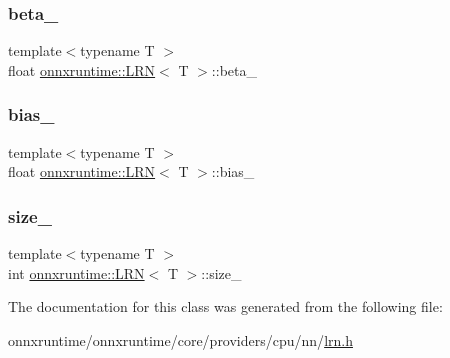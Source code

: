 \mbox{\label{classonnxruntime_1_1LRN_a690f2ff9893fad8423d0534af3e04869}} 
\subsubsection{\texorpdfstring{beta\+\_\+}{beta\_}}
{\footnotesize\ttfamily template$<$typename T $>$ \\
float \mbox{\hyperlink{classonnxruntime_1_1LRN}{onnxruntime\+::\+L\+RN}}$<$ T $>$\+::beta\+\_\+\hspace{0.3cm}{\ttfamily [protected]}}

\mbox{\label{classonnxruntime_1_1LRN_a94db5cd6e1d3ffebdee9413a08af9d90}} 
\subsubsection{\texorpdfstring{bias\+\_\+}{bias\_}}
{\footnotesize\ttfamily template$<$typename T $>$ \\
float \mbox{\hyperlink{classonnxruntime_1_1LRN}{onnxruntime\+::\+L\+RN}}$<$ T $>$\+::bias\+\_\+\hspace{0.3cm}{\ttfamily [protected]}}

\mbox{\label{classonnxruntime_1_1LRN_a4b87739b763f4acccd164dfd4c3397cb}} 
\subsubsection{\texorpdfstring{size\+\_\+}{size\_}}
{\footnotesize\ttfamily template$<$typename T $>$ \\
int \mbox{\hyperlink{classonnxruntime_1_1LRN}{onnxruntime\+::\+L\+RN}}$<$ T $>$\+::size\+\_\+\hspace{0.3cm}{\ttfamily [protected]}}



The documentation for this class was generated from the following file\+:\begin{DoxyCompactItemize}
\item 
onnxruntime/onnxruntime/core/providers/cpu/nn/\mbox{\hyperlink{cpu_2nn_2lrn_8h}{lrn.\+h}}\end{DoxyCompactItemize}

